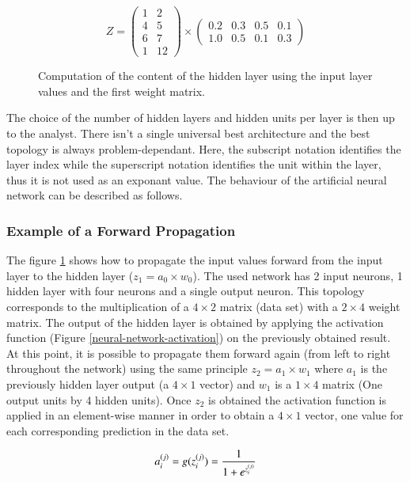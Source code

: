 \documentclass[a4paper,12pt, oneside]{memoir}
\begin{document}
\begin{figure}[h]
\[ Z = \left( \begin{array}{cc}
  1 & 2  \\
  4 & 5  \\
  6 & 7  \\
  1 & 12 
\end{array} \right) \times \left( \begin{array}{cccc}
  0.2  &  0.3  &  0.5  &  0.1 \\
  1.0  &  0.5  &  0.1  &  0.3 
\end{array} \right) \] 
\caption{Computation of the content of the hidden layer using the input layer values and the first weight matrix.}
\label{typical-matrix-calculation}
\end{figure}

The choice of the number of hidden layers and hidden units per layer is then up to the analyst. There isn't a single universal best architecture and the best topology is always problem-dependant. Here, the subscript notation identifies the layer index while the superscript notation identifies the unit within the layer, thus it is not used as an exponant value. The behaviour of the artificial neural network can be described as follows. 
\subsubsection{Example of a Forward Propagation} \label{forward-prop-example}
The figure \ref{typical-matrix-calculation} shows how to propagate the input values forward from the input layer to the hidden layer ($z_1 = a_0 \times w_0$). The used network has 2 input neurons, 1 hidden layer with four neurons and a single output neuron. This topology corresponds to the multiplication of a $4\times2$ matrix (data set) with a $2\times4$ weight matrix. The output of the hidden layer is obtained by applying the activation function (Figure \ref{neural-network-activation}) on the previously obtained result. At this point, it is possible to propagate them forward again (from left to right throughout the network) using the same principle $z_2 = a_1 \times w_1$ where $a_1$ is the previously hidden layer output (a $4\times1$ vector) and $w_1$ is a $1\times4$ matrix (One output units by 4 hidden units). Once $z_2$ is obtained the activation function is applied in an element-wise manner in order to obtain a $4\times1$ vector, one value for each corresponding prediction in the data set.

\begin{equation} \label{neural-network-activation}
  \displaystyle a_i^{(j)} = g(z_i^{(j)}) = {1 \over 1+ e^{z_i^{(j)}}}
\end{equation}
\end{document}
